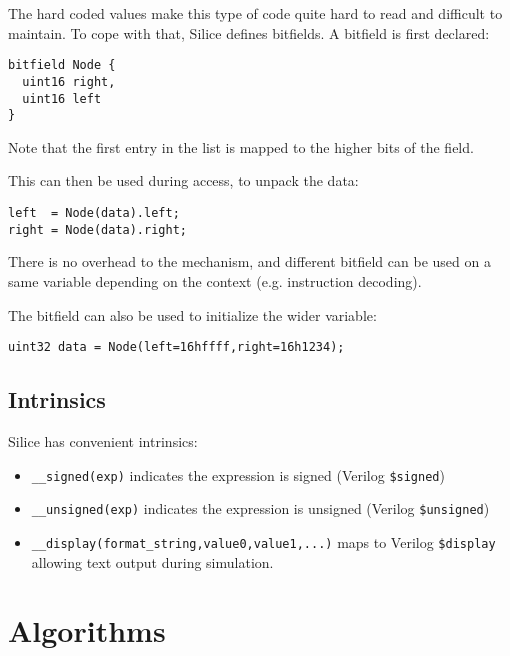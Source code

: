 \documentclass[a4]{article}
\newcommand\silice{Silice}
\begin{document}
The hard coded values make this type of code quite hard to read and difficult to maintain. To cope with that, \silice{} defines bitfields. A bitfield is first declared:

\begin{verbatim}
bitfield Node {
  uint16 right,
  uint16 left
}
\end{verbatim}

Note that the first entry in the list is mapped to the higher bits of the field.

This can then be used during access, to unpack the data:

\begin{verbatim}
left  = Node(data).left;
right = Node(data).right;
\end{verbatim}

There is no overhead to the mechanism, and different bitfield can be used on a same
variable depending on the context (e.g. instruction decoding).

The bitfield can also be used to initialize the wider variable:
\begin{verbatim}
uint32 data = Node(left=16hffff,right=16h1234);
\end{verbatim}

\subsection{Intrinsics}

\silice{} has convenient intrinsics:

\begin{itemize}
	\item \texttt{\_\_signed(exp)} indicates the expression is signed (Verilog \texttt{\$signed})
	\item \texttt{\_\_unsigned(exp)} indicates the expression is unsigned (Verilog \texttt{\$unsigned})
	\item \texttt{\_\_display(format\_string,value0,value1,...)} maps to Verilog \texttt{\$display} allowing text output during simulation.
\end{itemize}
	

\section{Algorithms}
\end{document}
